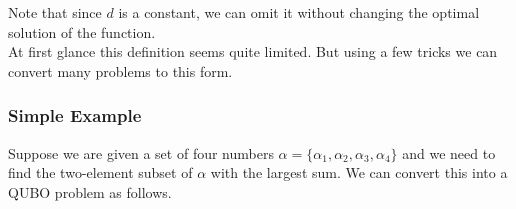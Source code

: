 \documentclass{article}
\begin{document}
\noindent Note that since \(d\) is a constant, we can omit it without changing the optimal solution of the function.\\

\noindent At first glance this definition seems quite limited. But using a few tricks we can convert many problems to this form.

\subsubsection{Simple Example}
\noindent Suppose we are given a set of four numbers \(\alpha = \{\alpha_1,\alpha_2, \alpha_3, \alpha_4\}\) and we need to find the two-element subset of \(\alpha\) with the largest sum. We can convert this into a QUBO problem as follows. \\
\end{document}
